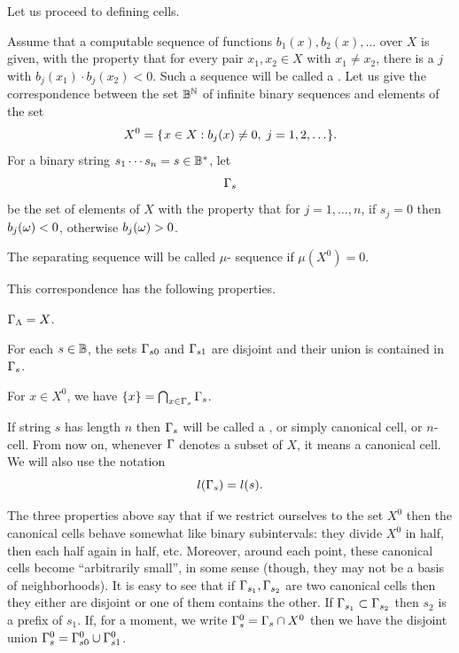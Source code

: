 Let us proceed to defining cells.

 \begin{definition}
  \label{def:g4.7.3}
  \notready
Assume that a computable sequence of functions 
\( b_{1}(x),b_{2}(x),\dots \) over \( X \) is given,
with the property that for every pair 
\( x_{1},x_{2}\in X \) with \( x_{1}\ne x_{2} \), there is a \( j \)
with \( b_{j}(x_{1})\cdot b_{j}(x_{2}) < 0 \).
Such a sequence will be called a .
Let us give the correspondence between the set \( \mathbb{B}^{\mathbb{N}} \)
of infinite binary sequences and elements of the set
 \[
  X^{0} = \mathopen\{\mskip 1mu x\in X: b_{j}(x)\ne 0,\;j=1,2,\dots\mskip 1mu\mathclose\}.
 \]
For a binary string 
\( s_{1}\dotsm s_{n} = s\in\mathbb{B}^{*} \), let
 \[
   \Gamma_{s}
 \]
be the set of elements of \( X \) with the property that for
\( j=1,\dots,n \), if \( s_{j}=0 \) then \( b_{j}(\omega) < 0 \), otherwise
\( b_{j}(\omega)>0 \).

The separating sequence will be called \( \mu \)- sequence
if \( \mu(X^{0})=0 \).
 \end{definition}

This correspondence has the following properties.
 \begin{alphenum}
  \item \( \Gamma_{\Lambda}=X \).
  \item For each \( s\in \mathbb{B} \), the sets \( \Gamma_{s0} \) and 
\( \Gamma_{s1} \) are disjoint and their union is contained in \( \Gamma_{s} \).
  \item For \( x\in X^0 \), we have \( \{x\} = \bigcap_{x\in\Gamma_{s}} \Gamma_{s} \).
 \end{alphenum}

 \begin{definition}[Cells]
  \label{def:g4.7.4}
  \notready
If string \( s \) has length \( n \) then \( \Gamma_{s} \) will be called a , or simply canonical cell, or \( n \)-cell.
From now on, whenever \( \Gamma \) denotes a subset of \( X \), it means a
canonical cell.
We will also use the notation
 \[
   l(\Gamma_{s})=l(s).
 \]
 \end{definition}

The three properties above say that if we restrict ourselves to the set
\( X^{0} \) then the canonical cells behave somewhat like binary subintervals:
they divide \( X^{0} \) in half, then each half again in half, etc.  
Moreover, around each point, these canonical cells become ``arbitrarily
small'', in some sense (though, they may not be a basis of neighborhoods).
It is easy to see that if \( \Gamma_{s_1},\Gamma_{s_2} \) are two canonical
cells then they either are disjoint or one of them contains the other.
If \( \Gamma_{s_1}\subset\Gamma_{s_2} \) then \( s_2 \) is a prefix of \( s_1 \).
If, for a moment, we write \( \Gamma^0_s=\Gamma_s\cap X^0 \) then we have the
disjoint union \( \Gamma^0_s=\Gamma^0_{s0}\cup\Gamma^0_{s1} \).

